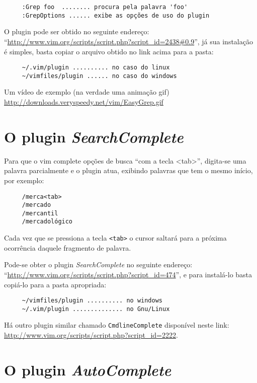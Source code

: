 \begin{verbatim}
     :Grep foo  ........ procura pela palavra 'foo'
     :GrepOptions ...... exibe as opções de uso do plugin
\end{verbatim}


O plugin pode ser obtido no seguinte endereço: 
``\url{http://www.vim.org/scripts/script.php?script_id=2438#0.9}'', já sua instalação
é simples, basta copiar o arquivo obtido no link acima para a pasta:
   
\begin{verbatim}
     ~/.vim/plugin .......... no caso do linux
     ~/vimfiles/plugin ...... no caso do windows
\end{verbatim}

Um vídeo de exemplo (na verdade uma animação gif)
\url{http://downloads.veryspeedy.net/vim/EasyGrep.gif}

\section{O plugin {\em SearchComplete}}

Para que o vim complete opções de busca ``com a tecla <tab>'', digita-se uma
palavra parcialmente e o plugin atua, exibindo palavras que tem 
o mesmo início, por exemplo:

\begin{verbatim}
     /merca<tab>
     /mercado
     /mercantil
     /mercadológico
\end{verbatim}

Cada vez que se pressiona a tecla {\tt <tab>} o cursor saltará para 
a próxima ocorrência daquele fragmento de palavra.

Pode-se obter o plugin {\em SearchComplete} no seguinte endereço: 
``\url{http://www.vim.org/scripts/script.php?script_id=474}'', 
e para instalá-lo basta copiá-lo para a pasta apropriada:
    
\begin{verbatim}
     ~/vimfiles/plugin .......... no windows
     ~/.vim/plugin .............. no Gnu/Linux
\end{verbatim}

Há outro plugin similar chamado {\tt CmdlineComplete} disponível neste link:
\url{http://www.vim.org/scripts/script.php?script_id=2222}.


\section{O plugin {\em AutoComplete}}
\label{sec:O Plugin AutoComplete}


